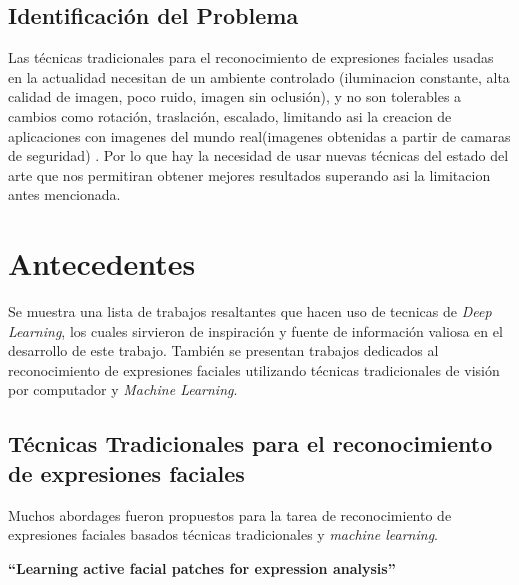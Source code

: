 \subsection{Identificación del Problema}
Las técnicas tradicionales para el reconocimiento de expresiones faciales usadas en la actualidad necesitan de un ambiente controlado (iluminacion constante, alta calidad de imagen, poco ruido, imagen sin oclusión), y no son tolerables a cambios como rotación, traslación, escalado, limitando asi la creacion de aplicaciones con imagenes del mundo real(imagenes obtenidas a partir de camaras de seguridad) . Por lo que hay la necesidad de usar nuevas técnicas del estado del arte que nos permitiran obtener mejores resultados superando asi la limitacion antes mencionada.

\section{Antecedentes}
Se muestra una lista de trabajos resaltantes que hacen uso de tecnicas de \textit{Deep Learning}, los cuales sirvieron de inspiración y fuente de información valiosa en el desarrollo de este trabajo. También se presentan trabajos dedicados al reconocimiento de expresiones faciales utilizando técnicas tradicionales de visión por computador y \textit{Machine Learning}.


\vspace{1cm}

\subsection{Técnicas Tradicionales para el reconocimiento de expresiones faciales}
Muchos abordages fueron propuestos para la tarea de reconocimiento de expresiones faciales basados técnicas tradicionales y \textit{machine learning}. 


\vspace{1cm}
\textbf{“Learning active facial patches for expression analysis” \cite{zhong2012learning}}\\

